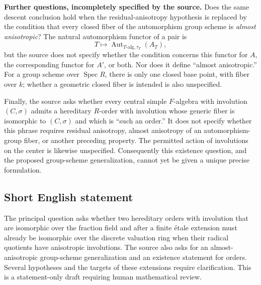 \documentclass[11pt]{article}
\begin{document}
\textbf{Further questions, incompletely specified by the source.} Does the same descent conclusion hold when the residual-anisotropy hypothesis is replaced by the condition that every closed fiber of the automorphism group scheme is \emph{almost anisotropic}? The natural automorphism functor of a pair is
\[
T\longmapsto\operatorname{Aut}_{T\text{-alg},\tau_T}(A_T),
\]
but the source does not specify whether the condition concerns this functor for \(A\), the corresponding functor for \(A'\), or both. Nor does it define ``almost anisotropic.'' For a group scheme over \(\operatorname{Spec}R\), there is only one closed base point, with fiber over \(k\); whether a geometric closed fiber is intended is also unspecified.

Finally, the source asks whether every central simple \(F\)-algebra with involution \((C,\sigma)\) admits a hereditary \(R\)-order with involution whose generic fiber is isomorphic to \((C,\sigma)\) and which is ``such an order.'' It does not specify whether this phrase requires residual anisotropy, almost anisotropy of an automorphism-group fiber, or another preceding property. The permitted action of involutions on the center is likewise unspecified. Consequently this existence question, and the proposed group-scheme generalization, cannot yet be given a unique precise formulation.
\subsection{Short English statement}
The principal question asks whether two hereditary orders with involution that are isomorphic over the fraction field and after a finite \'{e}tale extension must already be isomorphic over the discrete valuation ring when their radical quotients have anisotropic involutions. The source also asks for an almost-anisotropic group-scheme generalization and an existence statement for orders. Several hypotheses and the targets of these extensions require clarification. This is a statement-only draft requiring human mathematical review.
\end{document}

